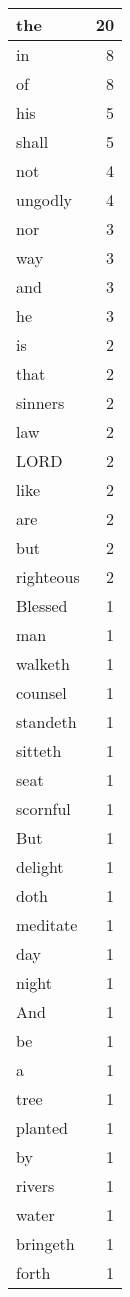 \begin{center}
\begin{longtable}{l|r}
\hline \hline
\endlastfoot
the & 20 \\ \hline
in & 8 \\ \hline
of & 8 \\ \hline
his & 5 \\ \hline
shall & 5 \\ \hline
not & 4 \\ \hline
ungodly & 4 \\ \hline
nor & 3 \\ \hline
way & 3 \\ \hline
and & 3 \\ \hline
he & 3 \\ \hline
is & 2 \\ \hline
that & 2 \\ \hline
sinners & 2 \\ \hline
law & 2 \\ \hline
LORD & 2 \\ \hline
like & 2 \\ \hline
are & 2 \\ \hline
but & 2 \\ \hline
righteous & 2 \\ \hline
Blessed & 1 \\ \hline
man & 1 \\ \hline
walketh & 1 \\ \hline
counsel & 1 \\ \hline
standeth & 1 \\ \hline
sitteth & 1 \\ \hline
seat & 1 \\ \hline
scornful & 1 \\ \hline
But & 1 \\ \hline
delight & 1 \\ \hline
doth & 1 \\ \hline
meditate & 1 \\ \hline
day & 1 \\ \hline
night & 1 \\ \hline
And & 1 \\ \hline
be & 1 \\ \hline
a & 1 \\ \hline
tree & 1 \\ \hline
planted & 1 \\ \hline
by & 1 \\ \hline
rivers & 1 \\ \hline
water & 1 \\ \hline
bringeth & 1 \\ \hline
forth & 1 \\ \hline

\end{longtable}
\end{center}
